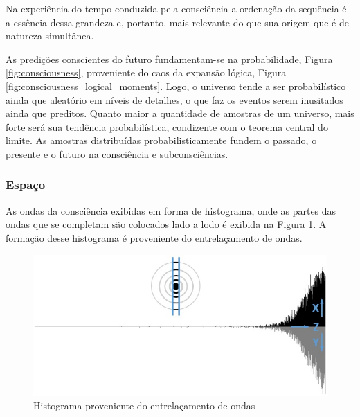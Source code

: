 Na experiência do tempo conduzida pela consciência a ordenação da sequência é a essência dessa grandeza e, portanto, mais relevante do que sua origem que é de natureza simultânea.

As predições conscientes do futuro fundamentam-se na probabilidade, Figura \ref{fig:consciousness}, proveniente do caos da expansão lógica, Figura \ref{fig:consciousness_logical_moments}. Logo, o universo tende a ser probabilístico ainda que aleatório em níveis de detalhes, o que faz os eventos serem inusitados ainda que preditos. Quanto maior a quantidade de amostras de um universo, mais forte será sua tendência probabilística, condizente com o teorema central do limite. As amostras distribuídas probabilisticamente fundem o passado, o presente e o futuro na consciência e subconsciências. 

\subsubsection{Espaço}
As ondas da consciência exibidas em forma de histograma, onde as partes das ondas que se completam são colocados lado a lodo é exibida na Figura \ref{fig:consciousness_space_waves}. A formação desse histograma é proveniente do entrelaçamento de ondas.
	\begin{figure}[H]
	\caption{Histograma proveniente do entrelaçamento de ondas}
	\label{fig:consciousness_space_waves}
	\centering
	\includegraphics[scale=.7]{sections/images/consciousness_space_waves.jpg}
	\end{figure}


